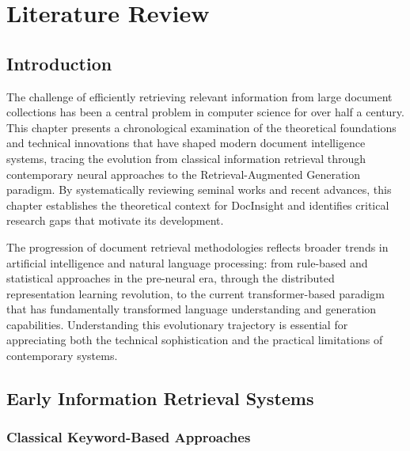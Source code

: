 
\chapter{Literature Review}

\section{Introduction}

The challenge of efficiently retrieving relevant information from large document collections has been a central problem in computer science for over half a century. This chapter presents a chronological examination of the theoretical foundations and technical innovations that have shaped modern document intelligence systems, tracing the evolution from classical information retrieval through contemporary neural approaches to the Retrieval-Augmented Generation paradigm. By systematically reviewing seminal works and recent advances, this chapter establishes the theoretical context for DocInsight and identifies critical research gaps that motivate its development.

The progression of document retrieval methodologies reflects broader trends in artificial intelligence and natural language processing: from rule-based and statistical approaches in the pre-neural era, through the distributed representation learning revolution, to the current transformer-based paradigm that has fundamentally transformed language understanding and generation capabilities. Understanding this evolutionary trajectory is essential for appreciating both the technical sophistication and the practical limitations of contemporary systems.

\section{Early Information Retrieval Systems}

\subsection{Classical Keyword-Based Approaches}

